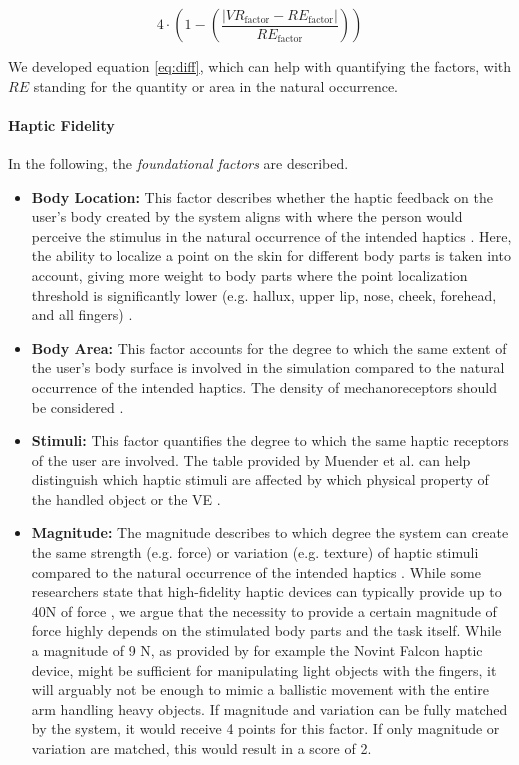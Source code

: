 \begin{equation}    
4 \cdot \left(1 - \left(\frac{\left|VR_{\text{factor}} - RE_{\text{factor}}\right|}{RE_{\text{factor}}}\right)\right)
\label{eq:diff}
\end{equation}

We developed equation \ref{eq:diff}, which can help with quantifying the factors, with $RE$ standing for the quantity or area in the natural occurrence.


\paragraph{Haptic Fidelity}
In the following, the \textit{foundational factors} are described.

\begin{itemize}
    \item \textbf{Body Location:} 
    This factor describes whether the haptic feedback on the user's body created by the system aligns with where the person would perceive the stimulus in the natural occurrence of the intended haptics \cite{Muender2022HapticReality}. Here, the ability to localize a point on the skin for different body parts is taken into account, giving more weight to body parts where the point localization threshold is significantly lower (e.g. hallux, upper lip, nose, cheek, forehead, and all fingers) \cite{Lederman2009HapticTutorial}.
    
    \item \textbf{Body Area:} 
    This factor accounts for the degree to which the same extent of the user's body surface is involved in the simulation compared to the natural occurrence of the intended haptics. The density of mechanoreceptors should be considered \cite{Muender2022HapticReality, Lederman2009HapticTutorial}.

    \item \textbf{Stimuli:}
    This factor quantifies the degree to which the same haptic receptors of the user are involved. The table provided by Muender et al. can help distinguish which haptic stimuli are affected by which physical property of the handled object or the VE \cite{Muender2022HapticReality}.
    
    \item \textbf{Magnitude:}
    The magnitude describes to which degree the system can create the same strength (e.g. force) or variation (e.g. texture) of haptic stimuli compared to the natural occurrence of the intended haptics \cite{Muender2022HapticReality}. While some researchers state that high-fidelity haptic devices can typically provide up to 40N of force \cite{Grant2019}, we argue that the necessity to provide a certain magnitude of force highly depends on the stimulated body parts and the task itself. While a magnitude of 9 N, as provided by for example the Novint Falcon haptic device, might be sufficient for manipulating light objects with the fingers, it will arguably not be enough to mimic a ballistic movement with the entire arm handling heavy objects.
    If magnitude and variation can be fully matched by the system, it would receive 4 points for this factor. If only magnitude or variation are matched, this would result in a score of 2.


\end{itemize}
